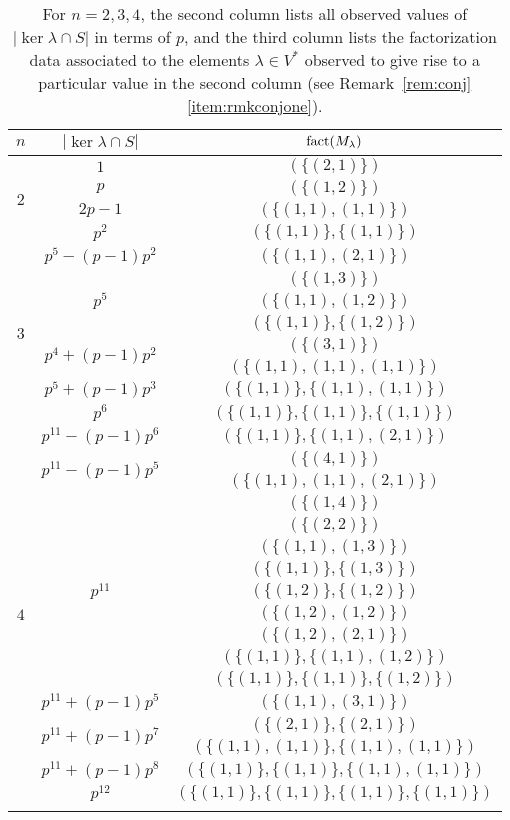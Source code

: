 \begin{table}[h]
\begin{tabular}{ccc}
\toprule
$n$&$|\ker\lambda\cap S|$&$\operatorname{fact}(M_\lambda)$\\
\midrule
\multirow{4}{*}{$2$}&$1$&$(\{(2,1)\})$\\
\cmidrule(l){2-3}
&$p$&$(\{(1,2)\})$\\
\cmidrule(l){2-3}
&$2p-1$&$(\{(1,1),(1,1)\})$\\
\cmidrule(l){2-3}
&$p^2$&$(\{(1,1)\},\{(1,1)\})$\\
\midrule
\multirow{8}{*}{$3$}&$p^5-(p-1)p^2$&$(\{(1,1),(2,1)\})$\\
\cmidrule(l){2-3}
&\multirow{3}{*}{$p^5$}&$(\{(1,3)\})$\\
&&$(\{(1,1),(1,2)\})$\\
&&$(\{(1,1)\},\{(1,2)\})$\\
\cmidrule(l){2-3}
&\multirow{2}{*}{$p^4+(p-1)p^2$}&$(\{(3,1)\})$\\
&&$(\{(1,1),(1,1),(1,1)\})$\\
\cmidrule(l){2-3}
&$p^5+(p-1)p^3$&$(\{(1,1)\},\{(1,1),(1,1)\})$\\
\cmidrule(l){2-3}
&$p^6$&$(\{(1,1)\},\{(1,1)\},\{(1,1)\})$\\
\midrule
\multirow{17}{*}{$4$}&$p^{11}-(p-1)p^6$&$(\{(1,1)\},\{(1,1),(2,1)\})$\\
\cmidrule(l){2-3}
&\multirow{2}{*}{$p^{11}-(p-1)p^5$}&$(\{(4,1)\})$\\
&&$(\{(1,1),(1,1),(2,1)\})$\\
\cmidrule(l){2-3}
&\multirow{9}{*}{$p^{11}$}&$(\{(1,4)\})$\\
&&$(\{(2,2)\})$\\
&&$(\{(1,1),(1,3)\})$\\
&&$(\{(1,1)\},\{(1,3)\})$\\
&&$(\{(1,2)\},\{(1,2)\})$\\
&&$(\{(1,2),(1,2)\})$\\
&&$(\{(1,2),(2,1)\})$\\
&&$(\{(1,1)\},\{(1,1),(1,2)\})$\\
&&$(\{(1,1)\},\{(1,1)\},\{(1,2)\})$\\
\cmidrule(l){2-3}
&$p^{11}+(p-1)p^5$&$(\{(1,1),(3,1)\})$\\
\cmidrule(l){2-3}
&\multirow{2}{*}{$p^{11}+(p-1)p^7$}&$(\{(2,1)\},\{(2,1)\})$\\
&&$(\{(1,1),(1,1)\},\{(1,1),(1,1)\})$\\
\cmidrule(l){2-3}
&$p^{11}+(p-1)p^8$&$(\{(1,1)\},\{(1,1)\},\{(1,1),(1,1)\})$\\
\cmidrule(l){2-3}
&$p^{12}$&$(\{(1,1)\},\{(1,1)\},\{(1,1)\},\{(1,1)\})$\\
\bottomrule\\
\end{tabular}
\caption{For $n=2,3,4$, the second column lists all observed values of $|\ker\lambda\cap S|$ in terms of $p$, and the third column lists the factorization data associated to the elements $\lambda\in V^*$ observed to give rise to a particular value in the second column (see Remark~\ref{rem:conj}\eqref{item:rmkconjone}).}
\label{tab:lowdim}
\end{table}

